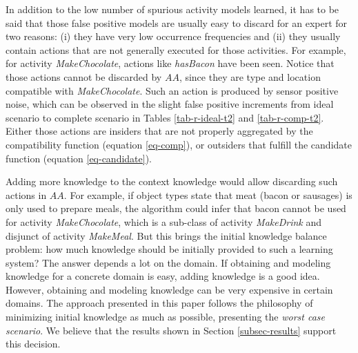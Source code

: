In addition to the low number of spurious activity models learned, it has to be said that those false positive models are usually easy to discard for an expert for two reasons: (i) they have very low occurrence frequencies and (ii) they usually contain actions that are not generally executed for those activities. For example, for activity \textit{MakeChocolate}, actions like \textit{hasBacon} have been seen. Notice that those actions cannot be discarded by $AA$, since they are type and location compatible with \textit{MakeChocolate}. Such an action is produced by sensor positive noise, which can be observed in the slight false positive increments from ideal scenario to complete scenario in Tables \ref{tab-r-ideal-t2} and \ref{tab-r-comp-t2}. Either those actions are insiders that are not properly aggregated by the compatibility function (equation \ref{eq-comp}), or outsiders that fulfill the candidate function (equation \ref{eq-candidate}). 

Adding more knowledge to the context knowledge would allow discarding such actions in $AA$. For example, if object types state that meat (bacon or sausages) is only used to prepare meals, the algorithm could infer that bacon cannot be used for activity \textit{MakeChocolate}, which is a sub-class of activity \textit{MakeDrink} and disjunct of activity \textit{MakeMeal}. But this brings the initial knowledge balance problem: how much knowledge should be initially provided to such a learning system? The answer depends a lot on the domain. If obtaining and modeling knowledge for a concrete domain is easy, adding knowledge is a good idea. However, obtaining and modeling knowledge can be very expensive in certain domains. The approach presented in this paper follows the philosophy of minimizing initial knowledge as much as possible, presenting the \textit{worst case scenario}. We believe that the results shown in Section \ref{subsec-results} support this decision.  